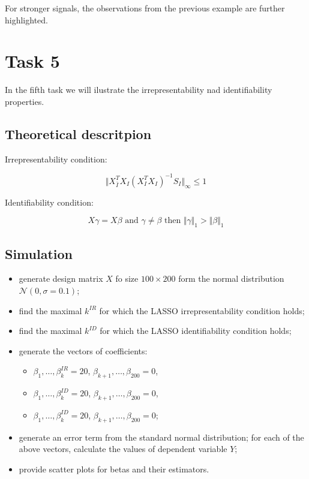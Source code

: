 \documentclass[
]{article}
\providecommand{\tightlist}{%
  \setlength{\itemsep}{0pt}\setlength{\parskip}{0pt}}
\begin{document}
For stronger signals, the observations from the previous example are
further highlighted.

\hypertarget{task-5}{%
\section{Task 5}\label{task-5}}

In the fifth task we will ilustrate the irrepresentability nad
identifiability properties.

\hypertarget{theoretical-descritpion}{%
\subsection{Theoretical descritpion}\label{theoretical-descritpion}}

Irrepresentability condition:

\[\Vert X_{\bar I}^TX_I  (X_I^TX_I)^{-1}S_I \Vert_{\infty} \leq 1\]

Identifiability condition:

\[X\gamma = X\beta \text{ and } \gamma \neq \beta \text{ then } \Vert\gamma\Vert_1 > \Vert\beta\Vert_1\]

\hypertarget{simulation}{%
\subsection{Simulation}\label{simulation}}

\begin{itemize}
\item
  generate design matrix \(X\) fo size \(100 \times 200\) form the
  normal distribution \(\mathcal N (0, \sigma = 0.1)\);
\item
  find the maximal \(k^{IR}\) for which the LASSO irrepresentability
  condition holds;
\item
  find the maximal \(k^{ID}\) for which the LASSO identifiability
  condition holds;
\item
  generate the vectors of coefficients:

  \begin{itemize}
  \tightlist
  \item
    \(\beta_1, \ldots, \beta_k^{IR} = 20\),
    \(\beta_{k+1}, \ldots, \beta_{200} = 0\),
  \item
    \(\beta_1, \ldots, \beta_k^{ID} = 20\),
    \(\beta_{k+1}, \ldots, \beta_{200} = 0\),
  \item
    \(\beta_1, \ldots, \beta_k^{ID} = 20\),
    \(\beta_{k+1}, \ldots, \beta_{200} = 0\);
  \end{itemize}
\item
  generate an error term from the standard normal distribution; for each
  of the above vectors, calculate the values of dependent variable
  \(Y\);
\item
  provide scatter plots for betas and their estimators.
\end{itemize}
\end{document}
